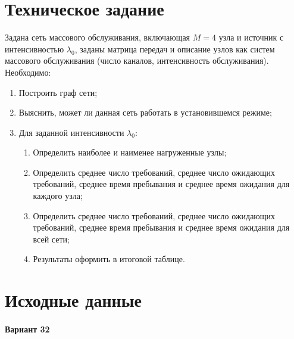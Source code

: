 





\tableofcontents
\listoftables
\listoffigures
\newpage

\section{Техническое задание}

Задана сеть массового обслуживания, включающая $M = 4$ узла и источник с интенсивностью $\lambda_0$, заданы матрица передач и описание узлов как систем массового обслуживания (число каналов, интенсивность обслуживания). Необходимо:

\begin{enumerate}
	\item Построить граф сети;
	\item Выяснить, может ли данная сеть работать в установившемся режиме;
	\item Для заданной интенсивности $\lambda_0$:
		\begin{enumerate}[label*=\arabic*]
			\item Определить наиболее и наименее нагруженные узлы;
			\item Определить среднее число требований, среднее число ожидающих требований,
			среднее время пребывания и среднее время ожидания для каждого узла;
			\item Определить среднее число требований, среднее число ожидающих требований,
			среднее время пребывания и среднее время ожидания для всей сети;
			\item Результаты оформить в итоговой таблице.
		\end{enumerate}
\end{enumerate}

\section{Исходные данные}

\paragraph{Вариант 32}

